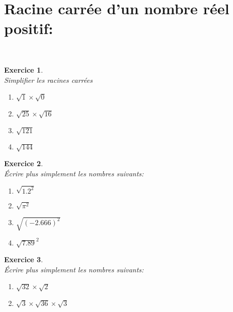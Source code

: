 \documentclass[a4paper,10pt]{article}
\newtheorem{exer}{Exercice}
\begin{document}
\section*{Racine carrée d'un nombre réel positif:}
\quad\\
\begin{minipage}[t]{1\linewidth}
	\begin{minipage}[t]{0.4\linewidth}
		\raggedright
		\begin{exer}\quad\\
			Simplifier les racines carrées 
			\begin{multicols}{2}
			\begin{enumerate}
								\item $\sqrt{1}\times\sqrt{0} $
								\item $\sqrt{25} \times \sqrt{16} $
								
								\item $\sqrt{121} $
								\item $\sqrt{144} $
								
			\end{enumerate}
			\end{multicols}
		\end{exer}
		\begin{exer}\quad\hfill\textbf{}\\
			Écrire plus simplement les nombres suivants:
	\begin{multicols}{2}
	\begin{enumerate}
						\item $\sqrt{1.2^{2}}  $
						\item $\sqrt{\pi^{2}} $
						
						\item $\sqrt{\left(-2.666\right)^{2}} $
						\item $\left. \sqrt{7.89}\right.^2 $
	\end{enumerate}
	\end{multicols}
				

		\end{exer}
		\begin{exer}\quad\hfill\textbf{}\\
			Écrire plus simplement les nombres suivants:
		\begin{multicols}{2}
		\begin{enumerate}
							\item $\sqrt{32}\times \sqrt{2} $
							
							\item $\sqrt{3}\times \sqrt{36}\times \sqrt{3} $
							

\end{enumerate}
\end{multicols}
\end{exer}
\end{minipage}
\end{minipage}
\end{document}
